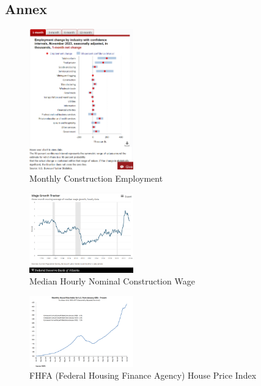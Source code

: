 \documentclass[
]{article}
\begin{document}
\newpage

\hypertarget{annex}{%
\subsection{Annex}\label{annex}}

\begin{figure}
\hypertarget{fig:label}{%
\centering
\includegraphics[width=0.4\textwidth,height=0.4\textheight]{const_emp.png}
\caption{Monthly Construction Employment}\label{fig:label}
}
\end{figure}

\begin{figure}
\hypertarget{fig:label}{%
\centering
\includegraphics[width=0.4\textwidth,height=0.4\textheight]{const_wage.png}
\caption{Median Hourly Nominal Construction Wage}\label{fig:label}
}
\end{figure}

\begin{figure}
\hypertarget{fig:label}{%
\centering
\includegraphics[width=0.4\textwidth,height=0.4\textheight]{fhfa_9123.png}
\caption{FHFA (Federal Housing Finance Agency) House Price
Index}\label{fig:label}
}
\end{figure}
\end{document}
